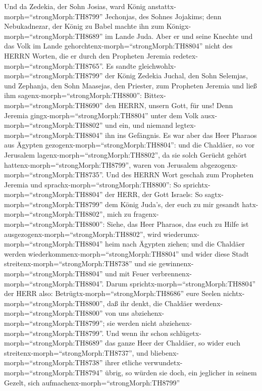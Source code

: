  Und da Zedekia, der Sohn Josias, ward König
anstattx-morph=``strongMorph:TH8799'' Jechonjas, des Sohnes Jojakims;
denn Nebukadnezar, der König zu Babel machte ihn zum
Königx-morph=``strongMorph:TH8689'' im Lande Juda.  Aber er
und seine Knechte und das Volk im Lande
gehorchtenx-morph=``strongMorph:TH8804'' nicht des HERRN Worten, die er
durch den Propheten Jeremia redetex-morph=``strongMorph:TH8765''.
 Es sandte gleichwohlx-morph=``strongMorph:TH8799'' der
König Zedekia Juchal, den Sohn Selemjas, und Zephanja, den Sohn
Maasejas, den Priester, zum Propheten Jeremia und ließ ihm
sagenx-morph=``strongMorph:TH8800'': Bittex-morph=``strongMorph:TH8690''
den HERRN, unsern Gott, für uns!  Denn Jeremia
gingx-morph=``strongMorph:TH8804'' unter dem Volk
ausx-morph=``strongMorph:TH8802'' und ein, und niemand
legtex-morph=``strongMorph:TH8804'' ihn ins Gefängnis.  Es
war aber das Heer Pharaos aus Ägypten
gezogenx-morph=``strongMorph:TH8804'': und die Chaldäer, so vor
Jerusalem lagenx-morph=``strongMorph:TH8802'', da sie solch Gerücht
gehört hattenx-morph=``strongMorph:TH8799'', waren von Jerusalem
abgezogenx-morph=``strongMorph:TH8735''.  Und des HERRN Wort
geschah zum Propheten Jeremia und sprachx-morph=``strongMorph:TH8800'':
 So sprichtx-morph=``strongMorph:TH8804'' der HERR, der Gott
Israels: So sagtx-morph=``strongMorph:TH8799'' dem König Juda's, der
euch zu mir gesandt hatx-morph=``strongMorph:TH8802'', mich zu
fragenx-morph=``strongMorph:TH8800'': Siehe, das Heer Pharaos, das euch
zu Hilfe ist ausgezogenx-morph=``strongMorph:TH8802'', wird
wiederumx-morph=``strongMorph:TH8804'' heim nach Ägypten ziehen;
 und die Chaldäer werden
wiederkommenx-morph=``strongMorph:TH8804'' und wider diese Stadt
streitenx-morph=``strongMorph:TH8738'' und sie
gewinnenx-morph=``strongMorph:TH8804'' und mit Feuer
verbrennenx-morph=``strongMorph:TH8804''.  Darum
sprichtx-morph=``strongMorph:TH8804'' der HERR also:
Betrügtx-morph=``strongMorph:TH8686'' eure Seelen
nichtx-morph=``strongMorph:TH8800'', daß ihr denkt, die Chaldäer
werdenx-morph=``strongMorph:TH8800'' von uns
abziehenx-morph=``strongMorph:TH8799''; sie werden nicht
abziehenx-morph=``strongMorph:TH8799''.  Und wenn ihr schon
schlügetx-morph=``strongMorph:TH8689'' das ganze Heer der Chaldäer, so
wider euch streitenx-morph=``strongMorph:TH8737'', und
bliebenx-morph=``strongMorph:TH8738'' ihrer etliche
verwundetx-morph=``strongMorph:TH8794'' übrig, so würden sie doch, ein
jeglicher in seinem Gezelt, sich aufmachenx-morph=``strongMorph:TH8799''
